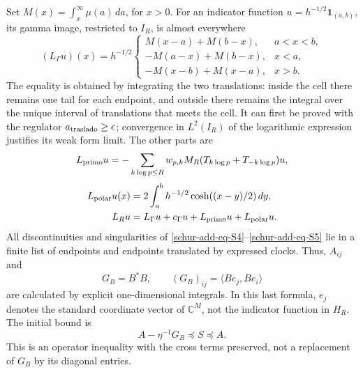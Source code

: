 Set \(M(x)=\int_x^\infty\mu(a)\,da\), for \(x>0\).
For an indicator function \(u=h^{-1/2}\mathbf1_{(a,b)}\), its gamma image,
restricted to \(I_R\), is almost everywhere
\begin{equation}
(L_\Gamma u)(x)=h^{-1/2}
\begin{cases}
M(x-a)+M(b-x),&a<x<b,\\
-M(a-x)+M(b-x),&x<a,\\
-M(x-b)+M(x-a),&x>b.
\end{cases}
\label{schur-add-eq-S4}
\end{equation}
The equality is obtained by integrating the two translations: inside the
cell there remains one tail for each endpoint, and outside there remains the integral over the
unique interval of translations that meets the cell. It can first be proved
with the regulator \(a_{\rm traslado}\geq\epsilon\); convergence in
\(L^2(I_R)\) of the logarithmic expression justifies its weak form
limit. The other parts are
\begin{equation}
L_{\rm primo}u=-\sum_{k\log p\leq R}w_{p,k}
M_R(T_{k\log p}+T_{-k\log p})u,
\label{schur-add-display-11}
\end{equation}
\begin{equation}
\begin{aligned}
L_{\rm polar}u(x)&=2\int_a^b h^{-1/2}\cosh((x-y)/2)\,dy,\\
L_Ru&=L_\Gamma u+c_\Gamma u+L_{\rm primo}u+L_{\rm polar}u.
\end{aligned}
\label{schur-add-eq-S5}
\end{equation}
All discontinuities and singularities of \eqref{schur-add-eq-S4}--\eqref{schur-add-eq-S5} lie in a
finite list of endpoints and endpoints translated by expressed clocks.
Thus, \(A_{ij}\) and
\begin{equation}
G_B=B^*B,\qquad (G_B)_{ij}=\langle Be_j,Be_i\rangle
\label{schur-add-display-13}
\end{equation}
are calculated by explicit one-dimensional integrals. In this last
formula, \(e_j\) denotes the standard coordinate vector of
\(\mathbb C^M\), not the indicator function in \(H_R\).
The initial bound is
\begin{equation}
A-\eta^{-1}G_B\preceq S\preceq A.
\label{schur-add-eq-S6}
\end{equation}
This is an operator inequality with the cross terms preserved, not a
replacement of \(G_B\) by its diagonal entries.

